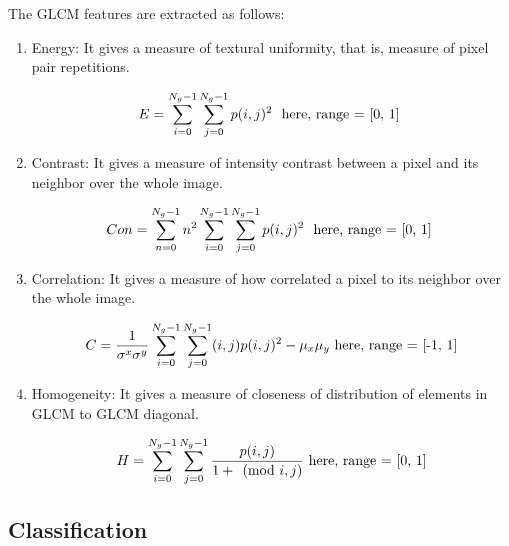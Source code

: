 \documentclass[11pt]{article}
\begin{document}
	The GLCM features are extracted as follows:

	\begin{enumerate}
		\item Energy: It gives a measure of textural uniformity, that is, measure
			of pixel pair repetitions.

			\begin{equation}
				E = \sum^{N_g - 1}_{i=0} \sum^{N_g - 1}_{j=0} p(i, j)^2 \
				\textnormal{ here, range = [0, 1] }
			\end{equation}

		\item Contrast: It gives a measure of intensity contrast between a pixel
			and its neighbor over the whole image.

			\begin{equation}
				Con = \sum^{N_g -1}_{n=0} n^2 \sum^{N_g -1}_{i=0} \sum^{N_g
				-1}_{j=0} p(i,j)^2 \
				\textnormal{ here, range = [0, 1] }
			\end{equation}

		\item Correlation: It gives a measure of how correlated a pixel to its
			neighbor over the whole image.

			\begin{equation}
				C = \frac{1}{\sigma^x \sigma^y}
				\sum^{N_g - 1}_{i=0} \sum^{N_g -1}_{j=0} (i,j) p(i,j)^2
				- \mu_x \mu_y \ \textnormal{here, range = [-1, 1]}
			\end{equation}

		\item Homogeneity: It gives a measure of closeness of distribution of
			elements in GLCM to GLCM diagonal.

			\begin{equation}
				H = \sum^{N_g -1}_{i=0} \sum^{N_g -1}_{j=0}
				\frac{p(i,j)}{1 + \pmod{i,j}}
				\ \textnormal{here, range = [0, 1]}
			\end{equation}
	\end{enumerate}

	\subsection{Classification}%
	\label{sub:Classification}
\end{document}

